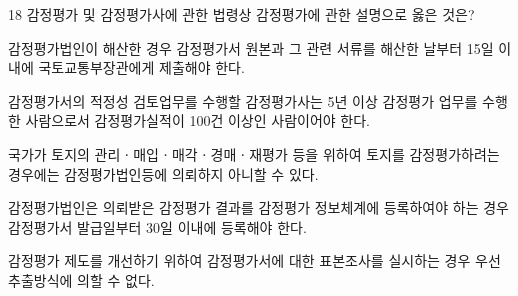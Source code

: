\begin{question}{18}
감정평가 및 감정평가사에 관한 법령상 감정평가에 관한 설명으로 옳은 것은?
\begin{choices}
  \item 감정평가법인이 해산한 경우 감정평가서 원본과 그 관련 서류를 해산한 날부터 15일 이내에 국토교통부장관에게 제출해야 한다.
  \item 감정평가서의 적정성 검토업무를 수행할 감정평가사는 5년 이상 감정평가 업무를 수행한 사람으로서 감정평가실적이 100건 이상인 사람이어야 한다.
  \item 국가가 토지의 관리ㆍ매입ㆍ매각ㆍ경매ㆍ재평가 등을 위하여 토지를 감정평가하려는 경우에는 감정평가법인등에 의뢰하지 아니할 수 있다.
  \item 감정평가법인은 의뢰받은 감정평가 결과를 감정평가 정보체계에 등록하여야 하는 경우 감정평가서 발급일부터 30일 이내에 등록해야 한다.
  \item 감정평가 제도를 개선하기 위하여 감정평가서에 대한 표본조사를 실시하는 경우 우선 추출방식에 의할 수 없다.
\end{choices}
\end{question}
